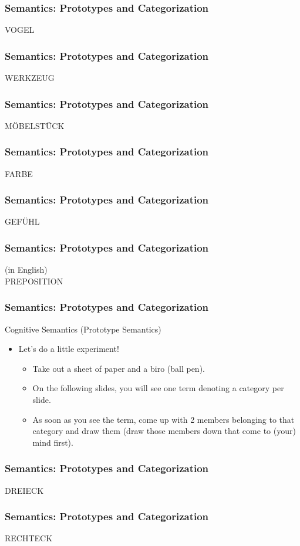 \documentclass[12pt, table]{beamer}
\begin{document}
\begin{frame}
\frametitle{Semantics: Prototypes and Categorization}
VOGEL
\end{frame}

\begin{frame}
\frametitle{Semantics: Prototypes and Categorization}
WERKZEUG
\end{frame}

\begin{frame}
\frametitle{Semantics: Prototypes and Categorization}
M{\"O}BELST{\"U}CK
\end{frame}

\begin{frame}
\frametitle{Semantics: Prototypes and Categorization}
FARBE
\end{frame}

\begin{frame}
\frametitle{Semantics: Prototypes and Categorization}
GEF{\"U}HL
\end{frame}

\begin{frame}
\frametitle{Semantics: Prototypes and Categorization}
(in English)\\[.5cm]
PREPOSITION
\end{frame}

\begin{frame}
\frametitle{Semantics: Prototypes and Categorization}
Cognitive Semantics (Prototype Semantics)
\begin{itemize}
\item Let's do a little experiment!
\begin{itemize}
\item Take out a sheet of paper and a biro (ball pen).
\item On the following slides, you will see one term denoting a category per slide.
\item As soon as you see the term, come up with 2 members belonging to that category and draw them (draw those members down that come to (your) mind first).
\end{itemize}
\end{itemize}
\end{frame}

\begin{frame}
\frametitle{Semantics: Prototypes and Categorization}
DREIECK
\end{frame}

\begin{frame}
\frametitle{Semantics: Prototypes and Categorization}
RECHTECK
\end{frame}
\end{document}
